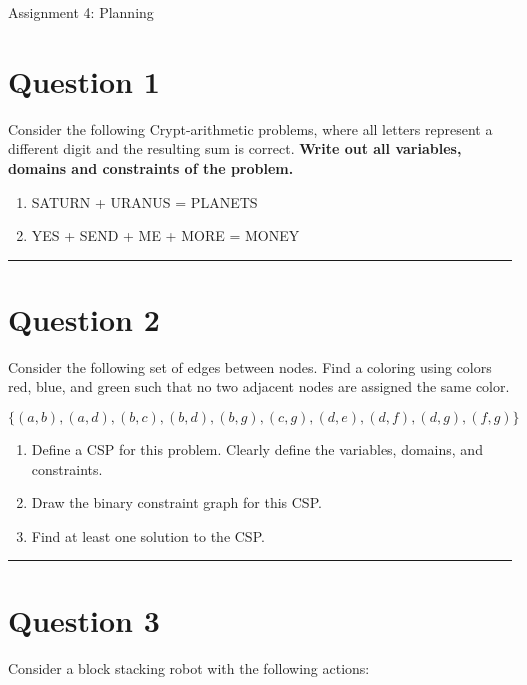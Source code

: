 \documentclass[11pt]{article}
\begin{document}
\begin{flushleft}
Assignment 4: Planning

\section*{Question 1}

Consider the following Crypt-arithmetic problems, where all letters represent a
different digit and the resulting sum is correct. \textbf{Write out all
variables, domains and constraints of the problem.}

    \begin{enumerate}[label=(\alph*)]
        \itemsep1em
        \item SATURN + URANUS = PLANETS
        \item YES + SEND + ME + MORE = MONEY
    \end{enumerate}

\rule[0.1pt]{40em}{1.0pt}

\section*{Question 2}
Consider the following set of edges between nodes. Find a coloring using colors
red, blue, and green such that no two adjacent nodes are assigned the same
color.

\begin{center}
$\{ (a, b),(a, d),(b, c),(b, d),(b, g),(c, g),(d, e),(d, f),(d, g),(f, g) \}$
\end{center}

\begin{enumerate}[label=(\alph*)]
\itemsep1em

    \item Define a CSP for this problem. Clearly define the variables, domains,
        and constraints.
        
    \item Draw the binary constraint graph for this CSP.

    \item Find at least one solution to the CSP. 

\end{enumerate}
\rule[0.1pt]{40em}{1.0pt}

\section*{Question 3}
Consider a block stacking robot with the following actions:


\end{flushleft}
\end{document}
